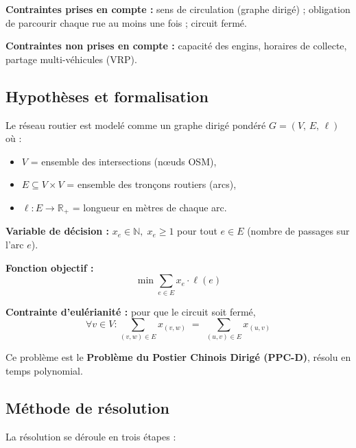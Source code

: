 \documentclass[11pt,a4paper]{article}
\begin{document}
\medskip
\noindent\textbf{Contraintes prises en compte :}
sens de circulation (graphe dirig\'e) ;
obligation de parcourir chaque rue au moins une fois ;
circuit ferm\'e.

\noindent\textbf{Contraintes non prises en compte :}
capacit\'e des engins, horaires de collecte, partage multi-v\'ehicules (VRP).

\subsection{Hypoth\`eses et formalisation}

Le r\'eseau routier est model\'e comme un graphe dirig\'e pond\'er\'e
$G = (V,\, E,\, \ell)$ o\`u :
\begin{itemize}
  \item $V$ = ensemble des intersections (n\oe uds OSM),
  \item $E \subseteq V \times V$ = ensemble des tron\c{c}ons routiers (arcs),
  \item $\ell : E \to \mathbb{R}_+$ = longueur en m\`etres de chaque arc.
\end{itemize}

\noindent\textbf{Variable de d\'ecision :}
$x_e \in \mathbb{N},\; x_e \geq 1$ pour tout $e \in E$ (nombre de passages
sur l'arc $e$).

\noindent\textbf{Fonction objectif :}
\begin{equation}
  \min \sum_{e \in E} x_e \cdot \ell(e)
\end{equation}

\noindent\textbf{Contrainte d'eul\'erianit\'e :} pour que le circuit soit ferm\'e,
\begin{equation}
  \forall v \in V : \sum_{(v,w)\in E} x_{(v,w)} \;=\; \sum_{(u,v)\in E} x_{(u,v)}
\end{equation}

Ce probl\`eme est le \textbf{Probl\`eme du Postier Chinois Dirig\'e (PPC-D)},
r\'esolu en temps polynomial.

\subsection{M\'ethode de r\'esolution}

La r\'esolution se d\'eroule en trois \'etapes :
\end{document}
